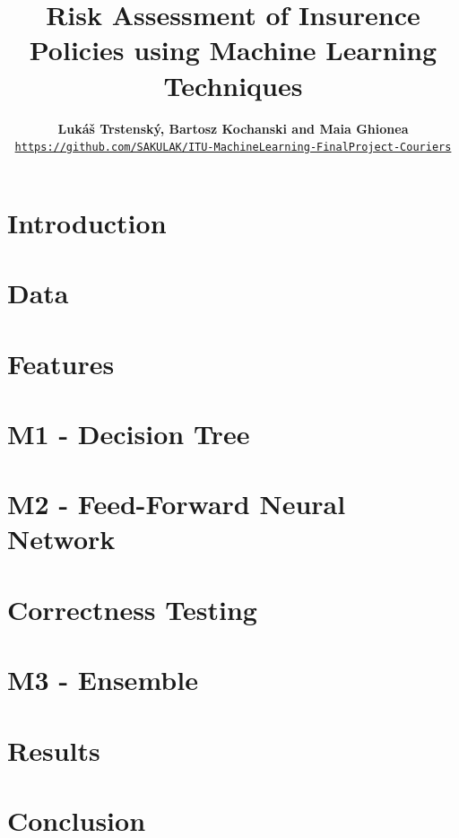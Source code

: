 \documentclass[11pt]{article}
\title{Risk Assessment of Insurence Policies using Machine Learning Techniques}
\author{
  \textbf{Lukáš Trstenský, Bartosz Kochanski and Maia Ghionea}\\
  \texttt{\small \href{https://github.com/SAKULAK/ITU-MachineLearning-FinalProject-Couriers}{https://github.com/SAKULAK/ITU-MachineLearning-FinalProject-Couriers}}
}
\date{}
\begin{document}
\sloppy
\renewcommand{\arraystretch}{1.5}
\maketitle
\tableofcontents
\clearpage

\section{Introduction}
    

\section{Data}
    

\section{Features}
    

\section{M1 - Decision Tree}
    

\section{M2 - Feed-Forward Neural Network}
    

\section{Correctness Testing}
    
    
\section{M3 - Ensemble}
    

\section{Results}
    

\section{Conclusion}
    



\end{document}
